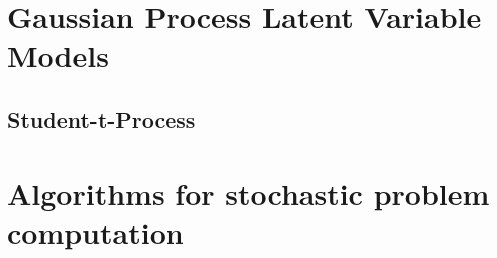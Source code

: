 \section{Gaussian Process Latent Variable Models}

\label{sec:GPLVM}
\cleardoubleoddpage

\subsection{Student-t-Process}

\label{sec:student-t}
\cleardoubleoddpage


\section{Algorithms for stochastic problem computation}

\label{sec:mcmc}
\cleardoubleoddpage
